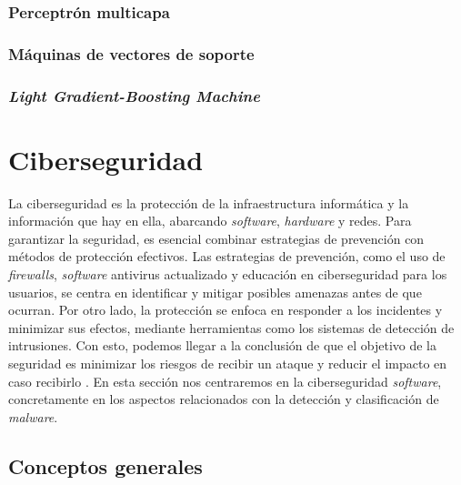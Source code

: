 
\subsubsection{Perceptrón multicapa}
\label{subsubsec:mlp}


\subsubsection{Máquinas de vectores de soporte}
\label{subsubsec:svm}


\subsubsection{\textit{Light Gradient-Boosting Machine}}
\label{subsubsec:lgbm}


\section{Ciberseguridad}
\label{sec:ciberseguridad}

La ciberseguridad es la protección de la infraestructura informática y la información que hay en ella, abarcando \textit{software}, \textit{hardware} y redes. Para garantizar la seguridad, es esencial combinar estrategias de prevención con métodos de protección efectivos. Las estrategias de prevención, como el uso de \textit{firewalls}, \textit{software} antivirus actualizado y educación en ciberseguridad para los usuarios, se centra en identificar y mitigar posibles amenazas antes de que ocurran. Por otro lado, la protección se enfoca en responder a los incidentes y minimizar sus efectos, mediante herramientas como los sistemas de detección de intrusiones. Con esto, podemos llegar a la conclusión de que el objetivo de la seguridad es minimizar los riesgos de recibir un ataque y reducir el impacto en caso recibirlo \cite{ciberseguridad_def}. En esta sección nos centraremos en la ciberseguridad \textit{software}, concretamente en los aspectos relacionados con la detección y clasificación de \textit{malware}.

\subsection{Conceptos generales}
\label{subsec:ciberseguridad_general}

